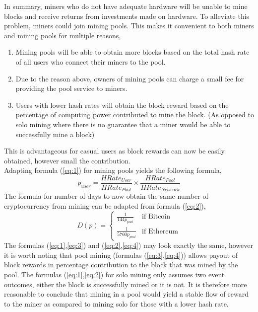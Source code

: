 \documentclass[a4paper,12pt]{article}
\begin{document}
{In summary, miners who do not have adequate hardware will be unable to mine blocks and receive returns from investments made on hardware. To alleviate this problem, miners could join mining pools. This makes it convenient to both miners and mining pools for multiple reasons,
\begin{enumerate}
	\item Mining pools will be able to obtain more blocks based on the total hash rate of all users who connect their miners to the pool.
	\item Due to the reason above, owners of mining pools can charge a small fee for providing the pool service to miners. 
	\item Users with lower hash rates will obtain the block reward based on the percentage of computing power contributed to mine the block. (As opposed to solo mining where there is no guarantee that a miner would be able to successfully mine a block)
\end{enumerate}
 This is advantageous for casual users as block rewards can now be easily obtained, however small the contribution.\\\newline
 Adapting formula (\ref{eq:1}) for mining pools yields the following formula,
 \begin{equation}\label{eq:3}
 p_{user}=\frac{HRate_{User}}{HRate_{Pool}}\times\frac{HRate_{Pool}}{HRate_{Network}}
 \end{equation}
 The formula for number of days to now obtain the same number of cryptocurrency from mining can be adapted from formula (\ref{eq:2}),
 	\begin{equation}\label{eq:4}
 D(p)=\begin{cases}\frac{1}{144p_{pool}}&\text{if Bitcoin}\\\frac{1}{5760p_{pool}}&\text{if Ethereum}\end{cases}
 \end{equation}
 The formulas (\ref{eq:1},\ref{eq:3}) and (\ref{eq:2},\ref{eq:4}) may look exactly the same, however it is worth noting that pool mining (formulas (\ref{eq:3},\ref{eq:4})) allows payout of block rewards in percentage contribution to the block that was mined by the pool. The formulas (\ref{eq:1},\ref{eq:2}) for solo mining only assumes two event outcomes, either the block is successfully mined or it is not. It is therefore more reasonable to conclude that mining in a pool would yield a stable flow of reward to the miner as compared to mining solo for those with a lower hash rate.
}
\end{document}
